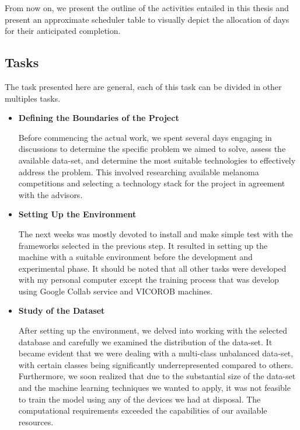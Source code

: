 From now on, we present the outline of the activities entailed in this thesis and present
an approximate scheduler table to visually depict the allocation of days for their anticipated completion.

\subsection{Tasks}

The task presented here are general, each of this task can be divided in other multiples tasks.

\begin{itemize}
  \item{\textbf{Defining the Boundaries of the Project}}

Before commencing the actual work,
we spent several days engaging in discussions to determine the specific problem we aimed to solve,
assess the available data-set, and determine the most suitable technologies to effectively address the problem.
This involved researching available melanoma competitions and selecting a technology stack for the project in agreement with the advisors.

\item{\textbf{Setting Up the Environment}}

The next weeks was mostly devoted to install and make simple test with the frameworks selected
in the previous step. It resulted in setting up the machine with a suitable environment
before the development and experimental phase.
It should be noted that all other tasks were developed with my personal computer except the training process that was develop using Google Collab service and VICOROB machines.

\item{\textbf{Study of the Dataset}}

After setting up the environment, we delved into working with the selected database and carefully
we examined the distribution of the data-set. It became evident that we were dealing
with a multi-class unbalanced data-set, with certain classes being significantly underrepresented compared to others. \\

Furthermore, we soon realized that due to the substantial size of the data-set and the machine learning techniques we wanted to apply,
it was not feasible to train the model using any of the devices we had at disposal.
The computational requirements exceeded the capabilities of our available resources.


\end{itemize}
